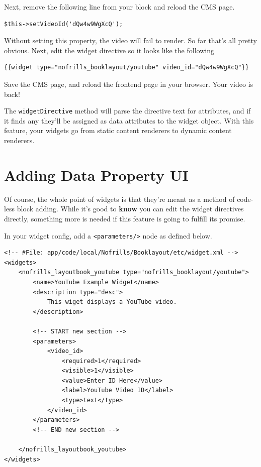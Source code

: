 \documentclass[oneside]{book}
\begin{document}
Next, remove the following line from your block and reload the CMS page.

\begin{lstlisting}
$this->setVideoId('dQw4w9WgXcQ');

\end{lstlisting}


Without setting this property, the video will fail to render.  So far that's all pretty obvious.  Next, edit the widget directive so it looks like the following

\begin{lstlisting}
{{widget type="nofrills_booklayout/youtube" video_id="dQw4w9WgXcQ"}}

\end{lstlisting}


Save the CMS page, and reload the frontend page in your browser.  Your video is back!

The \footnotesize\texttt{widgetDirective} \normalsize  method will parse the directive text for attributes, and if it finds any they'll be assigned as data attributes to the widget object.  With this feature, your widgets go from static content renderers to dynamic content renderers.

\section{Adding Data Property UI}

Of course, the whole point of widgets is that they're meant as a method of code-less block adding.  While it's good to \textbf{know} you can edit the widget directives directly, something more is needed if this feature is going to fulfill its promise.

In your widget config, add a \footnotesize\texttt{\textless parameters/\textgreater } \normalsize  node as defined below.

\begin{lstlisting}
<!-- #File: app/code/local/Nofrills/Booklayout/etc/widget.xml -->
<widgets>
    <nofrills_layoutbook_youtube type="nofrills_booklayout/youtube">
        <name>YouTube Example Widget</name>
        <description type="desc">
            This wiget displays a YouTube video.
        </description>

        <!-- START new section -->
        <parameters>
            <video_id>
                <required>1</required>
                <visible>1</visible>
                <value>Enter ID Here</value>
                <label>YouTube Video ID</label>
                <type>text</type>
            </video_id>
        </parameters>
        <!-- END new section -->

    </nofrills_layoutbook_youtube>
</widgets>

\end{lstlisting}
\end{document}
